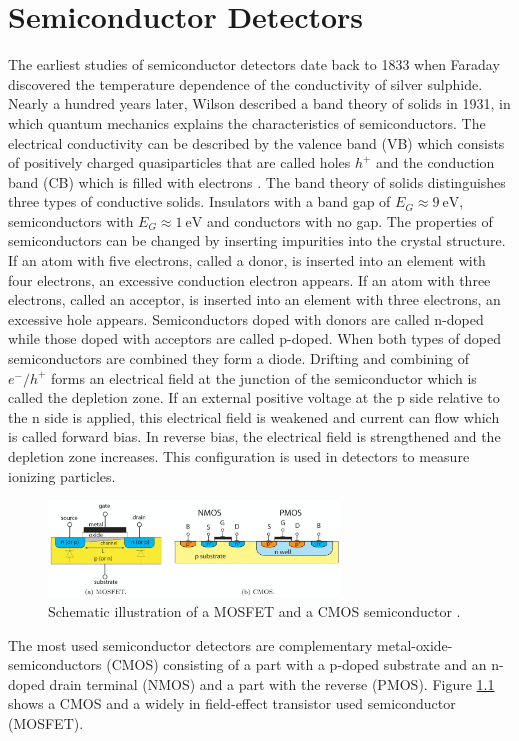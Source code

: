 \chapter{Semiconductor Detectors}\label{Semiconductors}

The earliest studies of semiconductor detectors date back to 1833 when Faraday discovered the temperature dependence of the conductivity of silver sulphide.
Nearly a hundred years later, Wilson described a band theory of solids in 1931, in which quantum mechanics explains the characteristics of semiconductors.
The electrical conductivity can be described by the valence band (VB) which consists of positively charged quasiparticles that are called holes $h^+$ and the conduction band (CB) which is filled with electrons \cite{KolanoskiWermes}.
The band theory of solids distinguishes three types of conductive solids.
Insulators with a band gap of $E_G\approx \SI{9}{\eV}$, semiconductors with $E_G\approx \SI{1}{\eV}$ and conductors with no gap.
The properties of semiconductors can be changed by inserting impurities into the crystal structure.
If an atom with five electrons, called a donor, is inserted into an element with four electrons, an excessive conduction electron appears.
If an atom with three electrons, called an acceptor, is inserted into an element with three electrons, an excessive hole appears.
Semiconductors doped with donors are called n-doped while those doped with acceptors are called p-doped.
When both types of doped semiconductors are combined they form a diode.
Drifting and combining of $e^-/h^+$ forms an electrical field at the junction of the semiconductor which is called the depletion zone.
If an external positive voltage at the p side relative to the n side is applied, this electrical field is weakened and current can flow which is called forward bias.
In reverse bias, the electrical field is strengthened and the depletion zone increases. 
This configuration is used in detectors to measure ionizing particles.
\begin{figure}[H]
    \centering
    \includegraphics[width=0.69\textwidth]{figs/MOS.png}
    \caption{Schematic illustration of a MOSFET and a CMOS semiconductor \cite{KolanoskiWermes}.}
    \label{fig:MOStransition}
\end{figure}
The most used semiconductor detectors are complementary metal-oxide-semiconductors (CMOS) consisting of a part with a p-doped substrate and an n-doped drain terminal (NMOS) and a part with the reverse (PMOS).
Figure \ref{fig:MOStransition} shows a CMOS and a widely in field-effect transistor used semiconductor (MOSFET).

